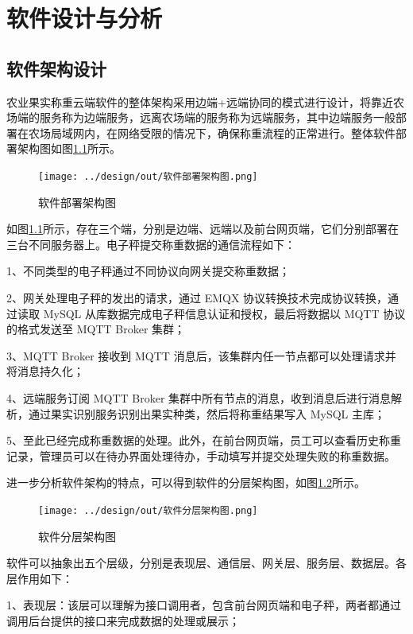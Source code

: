 \chapter{软件设计与分析}

\section{软件架构设计}\label{sec:architecture}

农业果实称重云端软件的整体架构采用边端+远端协同的模式进行设计，将靠近农场端的服务称为边端服务，远离农场端的服务称为远端服务，其中边端服务一般部署在农场局域网内，在网络受限的情况下，确保称重流程的正常进行。整体软件部署架构图如图\ref{fig:软件部署架构图}所示。

\begin{figure}[H]
    \centering
    \texttt{[image: ../design/out/软件部署架构图.png]}
    \caption{软件部署架构图}
    \label{fig:软件部署架构图}
\end{figure}

如图\ref{fig:软件部署架构图}所示，存在三个端，分别是边端、远端以及前台网页端，它们分别部署在三台不同服务器上。电子秤提交称重数据的通信流程如下：

1、不同类型的电子秤通过不同协议向网关提交称重数据；

2、网关处理电子秤的发出的请求，通过 EMQX 协议转换技术完成协议转换，通过读取 MySQL 从库数据完成电子秤信息认证和授权，最后将数据以 MQTT 协议的格式发送至 MQTT Broker 集群；

3、MQTT Broker 接收到 MQTT 消息后，该集群内任一节点都可以处理请求并将消息持久化；

4、远端服务订阅 MQTT Broker 集群中所有节点的消息，收到消息后进行消息解析，通过果实识别服务识别出果实种类，然后将称重结果写入 MySQL 主库；

5、至此已经完成称重数据的处理。此外，在前台网页端，员工可以查看历史称重记录，管理员可以在待办界面处理待办，手动填写并提交处理失败的称重数据。

进一步分析软件架构的特点，可以得到软件的分层架构图，如图\ref{fig:软件分层架构图}所示。

\begin{figure}[H]
    \centering
    \texttt{[image: ../design/out/软件分层架构图.png]}
    \caption{软件分层架构图}
    \label{fig:软件分层架构图}
\end{figure}

软件可以抽象出五个层级，分别是表现层、通信层、网关层、服务层、数据层。各层作用如下：

1、表现层：该层可以理解为接口调用者，包含前台网页端和电子秤，两者都通过调用后台提供的接口来完成数据的处理或展示；

